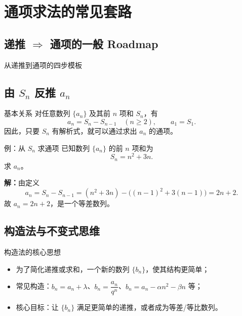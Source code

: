 \documentclass[a4paper,11pt]{ctexart}
\begin{document}
\section{通项求法的常见套路}

\subsection{递推 $\Rightarrow$ 通项的一般 Roadmap}

\begin{NoteRoadmap}{从递推到通项的四步模板}
\end{NoteRoadmap}

\subsection{由 $S_n$ 反推 $a_n$}

\begin{definitionbox}{基本关系}
  对任意数列 $\{a_n\}$ 及其前 $n$ 项和 $S_n$，有
  \[
    a_n=S_n-S_{n-1}\quad(n\ge2),\qquad a_1=S_1.
  \]
  因此，只要 $S_n$ 有解析式，就可以通过求出 $a_n$ 的通项。
\end{definitionbox}

\begin{examplebox}{例：从 $S_n$ 求通项}
  已知数列 $\{a_n\}$ 的前 $n$ 项和为
  \[
    S_n=n^2+3n.
  \]
  求 $a_n$。

  \textbf{解：}由定义
  \[
    a_n=S_n-S_{n-1}=(n^2+3n)-\bigl((n-1)^2+3(n-1)\bigr)=2n+2.
  \]
  故 $a_n=2n+2$，是一个等差数列。
\end{examplebox}

\subsection{构造法与不变式思维}

\begin{definitionbox}{构造法的核心思想}
  \begin{itemize}
    \item 为了简化递推或求和，一个新的数列 $\{b_n\}$，使其结构更简单；
    \item 常见构造：$b_n=a_n+\lambda$、$b_n=\dfrac{a_n}{q^n}$、$b_n=a_n-\alpha n^2-\beta n$ 等；
    \item 核心目标：让 $\{b_n\}$ 满足更简单的递推，或者成为等差/等比数列。
  \end{itemize}
\end{definitionbox}
\end{document}
